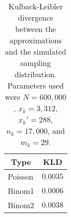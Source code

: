 \begin{table}[tb]
\caption{Kulback-Leibler divergence between the approximations and the simulated sampling distribution. Parameters used were $N=600,000$, $x_k=3,312$, $x_k'=288$, $n_k=17,000$, and $m_k=29$.\label{tab:kld}} 
\begin{center}
\begin{tabular}{lr}
\hline\hline
\multicolumn{1}{c}{Type}&\multicolumn{1}{c}{KLD}\tabularnewline
\hline
Poisson&$0.0035$\tabularnewline
Binom1&$0.0006$\tabularnewline
Binom2&$0.0038$\tabularnewline
\hline
\end{tabular}\end{center}
\end{table}

